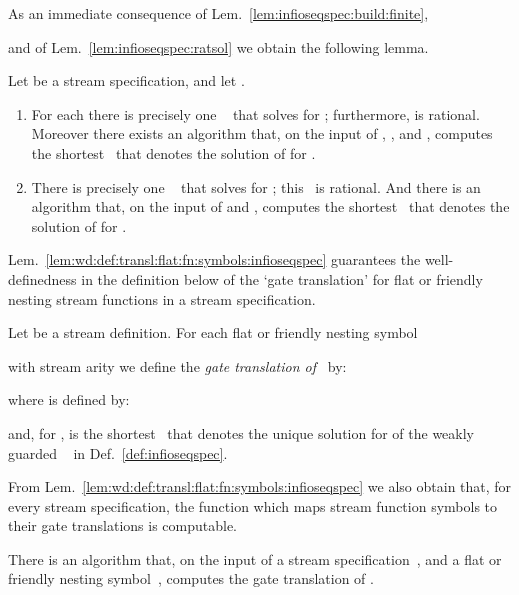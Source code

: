 As an immediate consequence of 
Lem.~\ref{lem:infioseqspec:build:finite},
 
and of Lem.~\ref{lem:infioseqspec:ratsol} we obtain the following lemma.


\begin{lemma}\label{lem:wd:def:transl:flat:fn:symbols:infioseqspec}
Let  be a stream specification,
  and let .
\begin{enumerate}
\item For each 
       there is precisely one \ioseq~ that solves
        for ;
       furthermore,  is rational.
       Moreover there exists an algorithm that,
       on the input of , , and ,
       computes the shortest \ioterm\ that denotes the 
       solution of  for .
\item There is precisely one \ioseq~ that solves
        for ;
       this \ioseq\ is rational.
       And there is an algorithm that, 
       on the input of  and ,
       computes the shortest \ioterm\ that denotes the 
       solution of  
       for .
\end{enumerate}
\end{lemma}


Lem.~\ref{lem:wd:def:transl:flat:fn:symbols:infioseqspec} guarantees 
the well-definedness in the definition below
of the `gate translation' for flat or friendly nesting stream functions 
in a stream specification. 

\begin{definition}\normalfont
  \label{def:transl:flat:fn:symbols:infioseqspec}
Let  be a stream definition. 
For each flat or friendly nesting symbol
   
  with stream arity  we define the \emph{gate translation  of\/~} by:

where  is defined by:

and, for ,
   is the shortest \ioterm\ that denotes
  the unique solution for 
  of the weakly guarded \infioseqspec~
  in Def.~\ref{def:infioseqspec}.
\end{definition}


From Lem.~\ref{lem:wd:def:transl:flat:fn:symbols:infioseqspec}
we also obtain that, for every stream specification,
the function which maps stream function symbols
to their gate translations is computable. 


\begin{lemma}\label{lem:transl:termination}
There is an algorithm that, on the input
  of a stream specification~, and
  a flat or friendly nesting symbol~,
  computes the gate translation  of .
\end{lemma}


